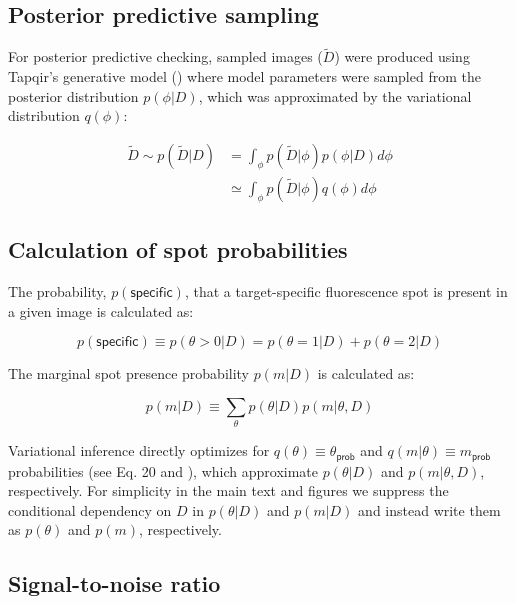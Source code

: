 \subsection{Posterior predictive sampling}

For posterior predictive checking, sampled images ($\widetilde{D}$) were produced using Tapqir's generative model () where model parameters were sampled from the posterior distribution $p(\phi|D)$, which was approximated by the variational distribution $q(\phi)$:

\begin{equation}
\begin{aligned}
    \widetilde{D} \sim p(\widetilde{D} | D) &= \int_\phi p(\widetilde{D} | \phi) p(\phi | D) d\phi \\
    &\simeq \int_\phi p(\widetilde{D} | \phi) q(\phi) d\phi
\end{aligned}
\end{equation}

\subsection{Calculation of spot probabilities}

The probability, $p(\mathsf{specific})$, that a target-specific fluorescence spot is present in a given image is calculated as:

\begin{equation}
    p(\mathsf{specific}) \equiv p(\theta > 0 | D) = p(\theta = 1 | D) + p(\theta = 2 | D)
\end{equation}

The marginal spot presence probability $p(m | D)$ is calculated as:

\begin{equation}
    p(m | D) \equiv \sum_\theta p(\theta | D) p(m | \theta, D)
\end{equation}

Variational inference directly optimizes for $q(\theta) \equiv \theta_\mathsf{prob}$ and $q(m | \theta) \equiv m_\mathsf{prob}$ probabilities (see Eq. 20 and ), which approximate $p(\theta | D)$ and $p(m | \theta, D)$, respectively. For simplicity in the main text and figures we suppress the conditional dependency on $D$ in $p(\theta | D)$ and $p(m | D)$ and instead write them as $p(\theta)$ and $p(m)$, respectively.

\subsection{Signal-to-noise ratio}

